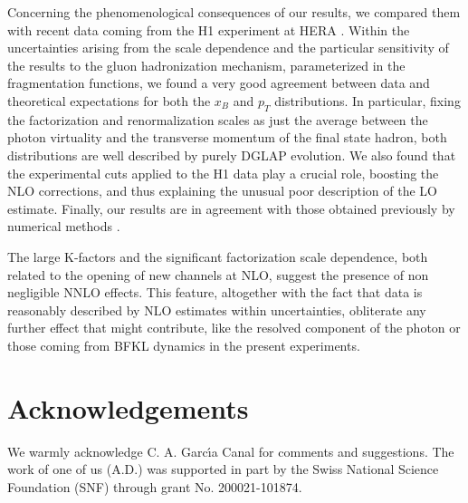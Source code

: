 \documentclass[superscriptaddress,showkeys,showpacs]{revtex4}
\begin{document}
Concerning the phenomenological consequences of our results, we compared them 
with recent data coming from the H1 experiment at HERA \cite{Aktas:2004rb}. 
Within the uncertainties arising from the scale dependence and the particular 
sensitivity of the results to the gluon hadronization mechanism, parameterized 
in the fragmentation functions, we found a very good agreement between data 
and theoretical expectations for both the $x_B$ and $p_T$ distributions. 
In particular, fixing the factorization and
renormalization scales as just the average between the photon virtuality and 
the transverse momentum of the final state hadron, both distributions are 
well described by purely DGLAP evolution. We also found that the experimental
cuts applied to the H1 data play a crucial role, boosting the NLO corrections,
and thus explaining the unusual poor description of the LO estimate. Finally, 
our results are in agreement with those obtained previously by numerical 
methods \cite{aure,Fontannaz:2004ev}.

The large K-factors and the significant factorization scale dependence, both
related to the opening of new channels at NLO, suggest the
presence of non negligible NNLO effects. This feature, altogether with the 
fact that data is reasonably described by NLO estimates within uncertainties, 
obliterate any further effect that might contribute, like the resolved 
component of the photon or those coming from BFKL dynamics in the present 
experiments.





\section{Acknowledgements}

 We warmly acknowledge C. A. Garc\'{\i}a Canal  for comments and suggestions. 
The work of one of us (A.D.) was supported in part by the Swiss National
Science Foundation (SNF) through grant No. 200021-101874.
\end{document}
